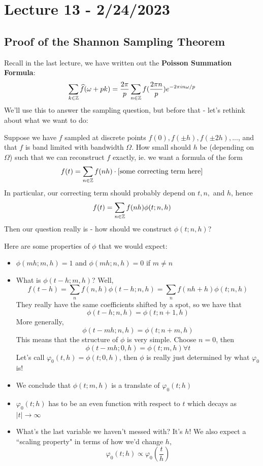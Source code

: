 \documentclass{article}
\begin{document}
\newpage
\section{Lecture 13 - 2/24/2023}

\subsection{Proof of the Shannon Sampling Theorem}
Recall in the last lecture, we have written out the \textbf{Poisson Summation Formula}:
\[\sum_{k \in \mathbb{Z}} \widehat{f}(\omega + pk) = \frac{2\pi}{p} \sum_{n \in \mathbb{Z}} f(\frac{2\pi n}{p}) e^{-2\pi i n \omega/p}\]
We'll use this to answer the sampling question, but before that - let's rethink about what we want to do:

\begin{question}
    Suppose we have $f$ sampled at discrete points $f(0), f(\pm h), f(\pm 2h), ...$, and that $f$ is band limited with bandwidth $\Omega$. How small should $h$ be (depending on $\Omega$) such that we can reconstruct $f$ exactly, ie. we want a formula of the form
    \[f(t) = \sum_{n \in \mathbb{Z}} f(nh) \cdot [\text{some correcting term here}]\]
    In particular, our correcting term should probably depend on $t, n, $ and $h$, hence
    \[f(t) = \sum_{n \in \mathbb{Z}} f(nh) \phi(t; n, h) \]
    Then our question really is - how should we construct $\phi(t; n, h)$?
\end{question}

Here are some properties of $\phi$ that we would expect:
\begin{itemize}
    \item $\phi(mh; m, h) = 1$ and $\phi(mh; n, h) = 0$ if $m \neq n$
    \item What is $\phi(t - h; m, h)$? Well,
    \[f(t - h) = \sum_n f(n, h) \phi(t - h; n, h) = \sum_n f(n h + h) \phi(t; n, h)\]
    They really have the same coefficients shifted by a spot, so we have that
    \[\phi(t - h; n, h) = \phi(t; n+1, h)\]
    More generally,
    \[\phi(t - mh; n, h) = \phi(t; n + m, h)\]
    This means that the structure of $\phi$ is very simple. Choose $n = 0$, then
    \[\phi(t - mh; 0, h) = \phi(t; m, h) \forall t\]
    Let's call $\varphi_0(t, h) = \phi(t; 0, h)$, then $\phi$ is really just determined by what $\varphi_0$ is!
    \item We conclude that $\phi(t; m, h)$ is a translate of $\varphi_0(t; h)$
    \item $\varphi_0(t; h)$ has to be an even function with respect to $t$ which decays as $|t| \to \infty$
    \item What's the last variable we haven't messed with? It's $h$! We also expect a ``scaling property" in terms of how we'd change $h$,
    \[\varphi_0(t; h) \propto \varphi_0(\frac{t}{h})\]
\end{itemize}
\end{document}

